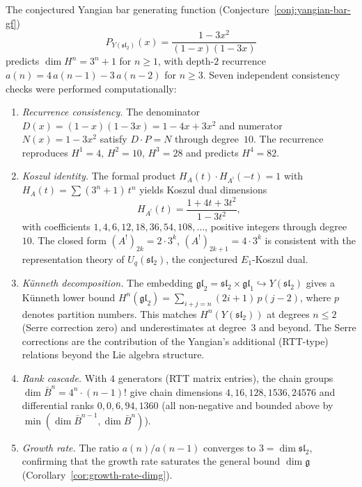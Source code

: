 The conjectured Yangian bar generating function
(Conjecture~\ref{conj:yangian-bar-gf})
\begin{equation}\label{eq:yangian-gf-appendix}
P_{Y(\mathfrak{sl}_2)}(x) = \frac{1 - 3x^2}{(1-x)(1-3x)}
\end{equation}
predicts $\dim H^n = 3^n + 1$ for $n \geq 1$, with depth-$2$ recurrence
$a(n) = 4\,a(n{-}1) - 3\,a(n{-}2)$ for $n \geq 3$. Seven independent
consistency checks were performed computationally:

\begin{enumerate}[label=(\roman*)]
\item \emph{Recurrence consistency.}
The denominator $D(x) = (1-x)(1-3x) = 1 - 4x + 3x^2$
and numerator $N(x) = 1 - 3x^2$ satisfy $D \cdot P = N$
through degree~$10$. The recurrence reproduces $H^1 = 4$,
$H^2 = 10$, $H^3 = 28$ and predicts $H^4 = 82$.

\item \emph{Koszul identity.}
The formal product $H_A(t) \cdot H_{A^!}(-t) = 1$
with $H_A(t) = \sum (3^n + 1)\,t^n$ yields
Koszul dual dimensions
\[
H_{A^!}(t) = \frac{1 + 4t + 3t^2}{1 - 3t^2},
\]
with coefficients $1, 4, 6, 12, 18, 36, 54, 108, \ldots$,
positive integers through degree~$10$. The closed form
$(A^!)_{2k} = 2 \cdot 3^k$, $(A^!)_{2k+1} = 4 \cdot 3^k$
is consistent with the representation theory of
$U_q(\mathfrak{sl}_2)$, the conjectured $E_1$-Koszul dual.

\item \emph{K\"unneth decomposition.}
The embedding $\mathfrak{gl}_2 = \mathfrak{sl}_2 \times
\mathfrak{gl}_1 \hookrightarrow Y(\mathfrak{sl}_2)$
gives a K\"unneth lower bound $H^n(\mathfrak{gl}_2) = \sum_{i+j=n}
(2i{+}1)\,p(j{-}2)$, where $p$ denotes
partition numbers. This matches $H^n(Y(\mathfrak{sl}_2))$
at degrees $n \leq 2$ (Serre correction zero) and underestimates
at degree~$3$ and beyond. The Serre
corrections are the contribution of the Yangian's additional
(RTT-type) relations beyond the Lie algebra structure.

\item \emph{Rank cascade.}
With $4$ generators (RTT matrix entries), the chain groups
$\dim \bar{B}^n = 4^n \cdot (n-1)!$ give chain dimensions
$4, 16, 128, 1536, 24576$ and differential ranks
$0, 0, 6, 94, 1360$ (all non-negative and bounded above by
$\min(\dim \bar{B}^{n-1}, \dim \bar{B}^n)$).

\item \emph{Growth rate.}
The ratio $a(n)/a(n{-}1)$ converges to $3 = \dim\mathfrak{sl}_2$,
confirming that the growth rate saturates the general bound
$\dim\mathfrak{g}$ (Corollary~\ref{cor:growth-rate-dimg}).


\end{enumerate}
